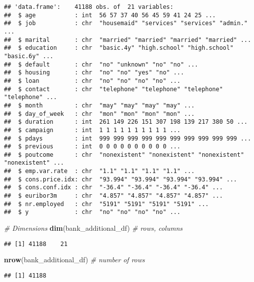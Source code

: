 \documentclass[
]{article}
\newenvironment{Shaded}{\begin{snugshade}}{\end{snugshade}}
\newcommand{\CommentTok}[1]{\textcolor[rgb]{0.56,0.35,0.01}{\textit{#1}}}
\newcommand{\FunctionTok}[1]{\textcolor[rgb]{0.13,0.29,0.53}{\textbf{#1}}}
\newcommand{\NormalTok}[1]{#1}
\begin{document}
\begin{verbatim}
## 'data.frame':    41188 obs. of  21 variables:
##  $ age           : int  56 57 37 40 56 45 59 41 24 25 ...
##  $ job           : chr  "housemaid" "services" "services" "admin." ...
##  $ marital       : chr  "married" "married" "married" "married" ...
##  $ education     : chr  "basic.4y" "high.school" "high.school" "basic.6y" ...
##  $ default       : chr  "no" "unknown" "no" "no" ...
##  $ housing       : chr  "no" "no" "yes" "no" ...
##  $ loan          : chr  "no" "no" "no" "no" ...
##  $ contact       : chr  "telephone" "telephone" "telephone" "telephone" ...
##  $ month         : chr  "may" "may" "may" "may" ...
##  $ day_of_week   : chr  "mon" "mon" "mon" "mon" ...
##  $ duration      : int  261 149 226 151 307 198 139 217 380 50 ...
##  $ campaign      : int  1 1 1 1 1 1 1 1 1 1 ...
##  $ pdays         : int  999 999 999 999 999 999 999 999 999 999 ...
##  $ previous      : int  0 0 0 0 0 0 0 0 0 0 ...
##  $ poutcome      : chr  "nonexistent" "nonexistent" "nonexistent" "nonexistent" ...
##  $ emp.var.rate  : chr  "1.1" "1.1" "1.1" "1.1" ...
##  $ cons.price.idx: chr  "93.994" "93.994" "93.994" "93.994" ...
##  $ cons.conf.idx : chr  "-36.4" "-36.4" "-36.4" "-36.4" ...
##  $ euribor3m     : chr  "4.857" "4.857" "4.857" "4.857" ...
##  $ nr.employed   : chr  "5191" "5191" "5191" "5191" ...
##  $ y             : chr  "no" "no" "no" "no" ...
\end{verbatim}

\begin{Shaded}
\begin{Highlighting}[]
\CommentTok{\# Dimensions}
\FunctionTok{dim}\NormalTok{(bank\_additional\_df)   }\CommentTok{\# rows, columns}
\end{Highlighting}
\end{Shaded}

\begin{verbatim}
## [1] 41188    21
\end{verbatim}

\begin{Shaded}
\begin{Highlighting}[]
\FunctionTok{nrow}\NormalTok{(bank\_additional\_df)  }\CommentTok{\# number of rows}
\end{Highlighting}
\end{Shaded}

\begin{verbatim}
## [1] 41188
\end{verbatim}
\end{document}
